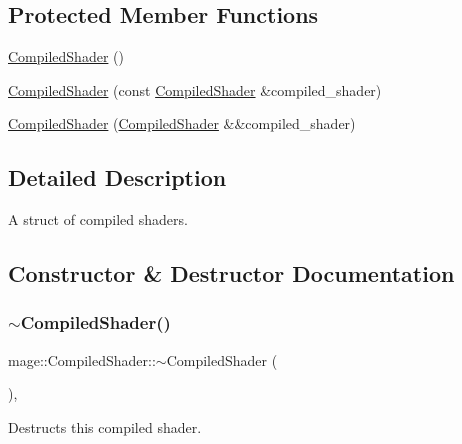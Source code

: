 \subsection*{Protected Member Functions}
\begin{DoxyCompactItemize}
\item 
\hyperlink{structmage_1_1_compiled_shader_a5f825dd407fff77c365efbe9e4d3dee8}{Compiled\+Shader} ()
\item 
\hyperlink{structmage_1_1_compiled_shader_a421bb5715494eea7c13d3dbb88a191bc}{Compiled\+Shader} (const \hyperlink{structmage_1_1_compiled_shader}{Compiled\+Shader} \&compiled\+\_\+shader)
\item 
\hyperlink{structmage_1_1_compiled_shader_a8960c4c808bd170ca00a50c05148ae8c}{Compiled\+Shader} (\hyperlink{structmage_1_1_compiled_shader}{Compiled\+Shader} \&\&compiled\+\_\+shader)
\end{DoxyCompactItemize}


\subsection{Detailed Description}
A struct of compiled shaders. 

\subsection{Constructor \& Destructor Documentation}
\hypertarget{structmage_1_1_compiled_shader_a40805ed2bcd988824d130aeb07200f21}{}\label{structmage_1_1_compiled_shader_a40805ed2bcd988824d130aeb07200f21} 
\subsubsection{\texorpdfstring{$\sim$\+Compiled\+Shader()}{~CompiledShader()}}
{\footnotesize\ttfamily mage\+::\+Compiled\+Shader\+::$\sim$\+Compiled\+Shader (\begin{DoxyParamCaption}{ }\end{DoxyParamCaption})\hspace{0.3cm}{\ttfamily [virtual]}, {\ttfamily [default]}}

Destructs this compiled shader. \hypertarget{structmage_1_1_compiled_shader_a5f825dd407fff77c365efbe9e4d3dee8}{}\label{structmage_1_1_compiled_shader_a5f825dd407fff77c365efbe9e4d3dee8} 
